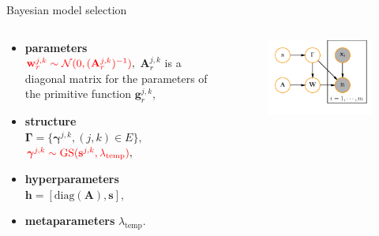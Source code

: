 \documentclass[usenames,dvipsnames,11pt,pdf,utf8,russian,aspectratio=169]{beamer}
\begin{document}
\begin{frame}{Bayesian model selection}


\begin{columns}
\begin{column}{0.6\textwidth}
\begin{itemize}
\item \textbf{parameters} \\ $\textcolor{red}{\mathbf{w}_r^{j,k} \sim \mathcal{N}(0, (\mathbf{A}_r^{j,k})^{-1})},$
$\mathbf{A}_r^{j,k}$ is a diagonal matrix for the parameters of the primitive function $\mathbf{g}_r^{j,k}$,
\item \textbf{structure} \\$\boldsymbol{\Gamma} = \{\boldsymbol{\gamma}^{j,k}, (j,k) \in E\},$ \\$\textcolor{red}{\boldsymbol{\gamma}^{j,k} \sim \text{GS}(\mathbf{s}^{j,k}, \lambda_\text{temp})},$ 
\item \textbf{hyperparameters} $\mathbf{h} = [\text{diag}(\mathbf{A}), \mathbf{s} ],$
\item \textbf{metaparameters} $\lambda_\text{temp}$.
\end{itemize}

\end{column}


\begin{column}{0.4\textwidth}
\begin{figure}
\includegraphics[width=\textwidth]{simple_plate_concrete.pdf}
\end{figure}
\end{column}

\end{columns}

%

\end{frame}
\end{document}

